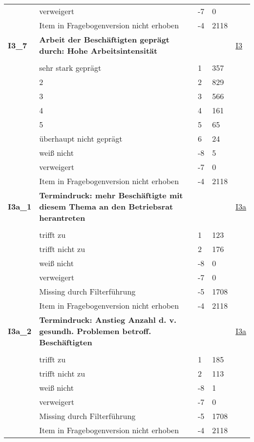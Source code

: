 \begin{longtable}{| L{2.5cm} | L{8.25cm}| C{1.5cm} | R{1.25cm} | C{2.25cm} |  }
   & verweigert & -7 & 0 &  \\ 
   & Item in Fragebogenversion nicht erhoben & -4 & 2118 &  \\ 
   \midrule
\textbf{I3\_7}\label{var:suf:I3:7} & \textbf{Arbeit der Beschäftigten geprägt durch: Hohe Arbeitsintensität} &  &  & \hyperref[I3]{I3} \\ 
   &  &  &  &  \\ 
   & sehr stark geprägt & 1 & 357 &  \\ 
   & 2 & 2 & 829 &  \\ 
   & 3 & 3 & 566 &  \\ 
   & 4 & 4 & 161 &  \\ 
   & 5 & 5 & 65 &  \\ 
   & überhaupt nicht geprägt & 6 & 24 &  \\ 
   & weiß nicht & -8 & 5 &  \\ 
   & verweigert & -7 & 0 &  \\ 
   & Item in Fragebogenversion nicht erhoben & -4 & 2118 &  \\ 
   \midrule
\textbf{I3a\_1}\label{var:suf:I3a:1} & \textbf{Termindruck: mehr Beschäftigte mit diesem Thema an den Betriebsrat herantreten} &  &  & \hyperref[I3a]{I3a} \\ 
   &  &  &  &  \\ 
   & trifft zu & 1 & 123 &  \\ 
   & trifft nicht zu & 2 & 176 &  \\ 
   & weiß nicht & -8 & 0 &  \\ 
   & verweigert & -7 & 0 &  \\ 
   & Missing durch Filterführung & -5 & 1708 &  \\ 
   & Item in Fragebogenversion nicht erhoben & -4 & 2118 &  \\ 
   \midrule
\textbf{I3a\_2}\label{var:suf:I3a:2} & \textbf{Termindruck: Anstieg Anzahl d. v. gesundh. Problemen betroff. Beschäftigten} &  &  & \hyperref[I3a]{I3a} \\ 
   &  &  &  &  \\ 
   & trifft zu & 1 & 185 &  \\ 
   & trifft nicht zu & 2 & 113 &  \\ 
   & weiß nicht & -8 & 1 &  \\ 
   & verweigert & -7 & 0 &  \\ 
   & Missing durch Filterführung & -5 & 1708 &  \\ 
   & Item in Fragebogenversion nicht erhoben & -4 & 2118 &  \\ 

\end{longtable}
